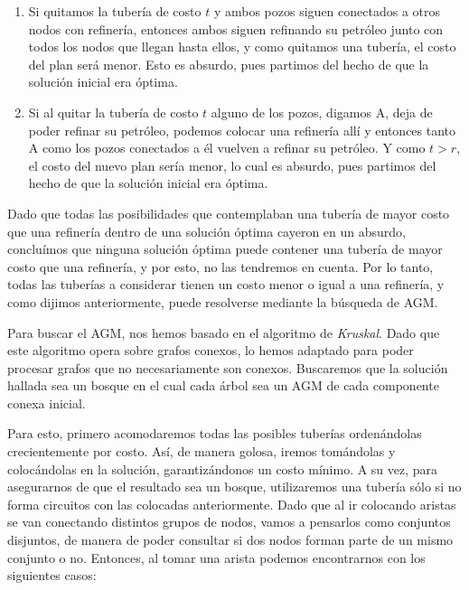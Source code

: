 \begin{enumerate}
	\begin{enumerate}
		\item Si quitamos la tubería de costo $t$ y ambos pozos siguen conectados a otros nodos con refinería, entonces ambos siguen refinando su petróleo junto con todos los nodos que llegan hasta ellos, y como quitamos una tubería, el costo del plan será menor.  Esto es absurdo, pues partimos del hecho de que la solución inicial era óptima.
		\item Si al quitar la tubería de costo $t$ alguno de los pozos, digamos A, deja de poder refinar su petróleo, podemos colocar una refinería allí y entonces tanto A como los pozos conectados a él vuelven a refinar su petróleo. Y como $t > r$, el costo del nuevo plan sería menor, lo cual es absurdo, pues partimos del hecho de que la solución inicial era óptima.
	\end{enumerate}
	
\end{enumerate}

Dado que todas las posibilidades que contemplaban una tubería de mayor costo que una refinería dentro de una solución óptima cayeron en un absurdo, concluímos que ninguna solución óptima puede contener una tubería de mayor costo que una refinería, y por esto, no las tendremos en cuenta. Por lo tanto, todas las tuberías a considerar tienen un costo menor o igual a una refinería, y como dijimos anteriormente, puede resolverse mediante la búsqueda de AGM.

Para buscar el AGM, nos hemos basado en el algoritmo de {\it Kruskal}.  Dado que este algoritmo opera sobre grafos conexos, lo hemos adaptado para poder procesar grafos que no necesariamente son conexos. Buscaremos que la solución hallada sea un bosque en el cual cada árbol sea un AGM de cada componente conexa inicial.

Para esto, primero acomodaremos todas las posibles tuberías ordenándolas crecientemente por costo. Así, de manera golosa, iremos tomándolas y colocándolas en la solución, garantizándonos un costo mínimo. A su vez, para asegurarnos de que el resultado sea un bosque, utilizaremos una tubería sólo si no forma circuitos con las colocadas anteriormente. Dado que al ir colocando aristas se van conectando distintos grupos de nodos, vamos a pensarlos como conjuntos disjuntos, de manera de poder consultar si dos nodos forman parte de un mismo conjunto o no.  Entonces, al tomar una arista podemos encontrarnos con los siguientes casos:

